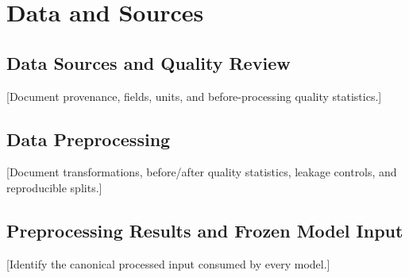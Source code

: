 \section{Data and Sources}
\subsection{Data Sources and Quality Review}
[Document provenance, fields, units, and before-processing quality statistics.]
\subsection{Data Preprocessing}
[Document transformations, before/after quality statistics, leakage controls, and reproducible splits.]
\subsection{Preprocessing Results and Frozen Model Input}
[Identify the canonical processed input consumed by every model.]
